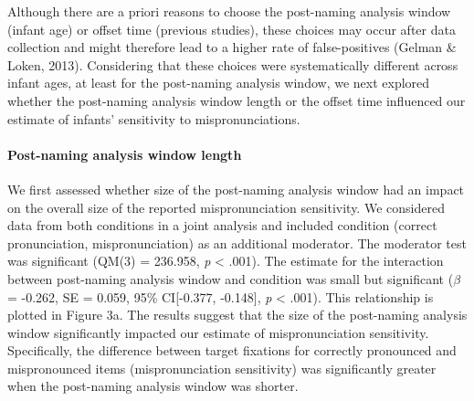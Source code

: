 \documentclass[man]{apa6}
\let\oldparagraph\paragraph
\renewcommand{\paragraph}[1]{\oldparagraph{#1}\mbox{}}
\theoremstyle{definition}
\theoremstyle{definition}
\theoremstyle{definition}
\theoremstyle{remark}
\begin{document}
Although there are a priori reasons to choose the post-naming analysis
window (infant age) or offset time (previous studies), these choices may
occur after data collection and might therefore lead to a higher rate of
false-positives (Gelman \& Loken, 2013). Considering that these choices
were systematically different across infant ages, at least for the
post-naming analysis window, we next explored whether the post-naming
analysis window length or the offset time influenced our estimate of
infants' sensitivity to mispronunciations.

\paragraph{Post-naming analysis window
length}\label{post-naming-analysis-window-length}

We first assessed whether size of the post-naming analysis window had an
impact on the overall size of the reported mispronunciation sensitivity.
We considered data from both conditions in a joint analysis and included
condition (correct pronunciation, mispronunciation) as an additional
moderator. The moderator test was significant (QM(3) = 236.958, \emph{p}
\textless{} .001). The estimate for the interaction between post-naming
analysis window and condition was small but significant (\(\beta\) =
-0.262, SE = 0.059, 95\% CI{[}-0.377, -0.148{]}, \emph{p} \textless{}
.001). This relationship is plotted in Figure 3a. The results suggest
that the size of the post-naming analysis window significantly impacted
our estimate of mispronunciation sensitivity. Specifically, the
difference between target fixations for correctly pronounced and
mispronounced items (mispronunciation sensitivity) was significantly
greater when the post-naming analysis window was shorter.
\end{document}
